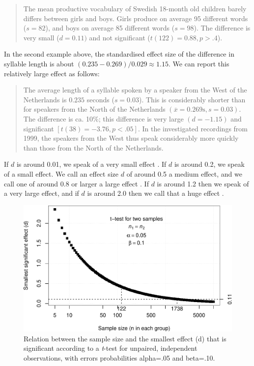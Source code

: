 \documentclass[
]{book}
\begin{document}
\begin{quote}
The mean productive vocabulary of Swedish 18-month old children
barely differs between girls and boys. Girls
produce on average 95 different words (\(s=82\)), and boys
on average 85 different words (\(s=98\)). The difference is very
small (\(d=0.11)\) and not significant (\(t(122)=0.88, p>.4\)).
\end{quote}

In the second example above, the standardised effect size of the difference
in syllable length is about
\((0.235-0.269)/0.029 \approx 1.15\). We can report this relatively large
effect as follows:

\begin{quote}
The average length of a syllable spoken by a speaker from
the West of the Netherlands is \(0.235\) seconds (\(s=0.03\)). This is
considerably shorter than for speakers from the North of the Netherlands
\((\overline{x}=0.269 \textrm{s}, s=0.03)\). The difference is ca. 10\%; this
difference is very large \((d=-1.15)\) and significant
\([t(38)=-3.76, p<.05]\). In the investigated recordings from 1999, the
speakers from the West thus speak considerably more quickly than those from
the North of the Netherlands.
\end{quote}

If \(d\) is around 0.01, we speak of a very small effect \citep{Sawi09}.
If \(d\) is around 0.2, we speak of a small effect. We call an effect size
\(d\) of around 0.5 a medium effect, and we call one
of around 0.8 or larger a large effect \citep{Cohen88, Rose08}.
If \(d\) is around 1.2 then we speak of a very large effect, and if \(d\) is around 2.0 then we call that a huge effect \citep{Sawi09}.

\begin{figure}
\centering
\includegraphics{QMS-EN_files/figure-latex/smallestsignifdifference-1.pdf}
\caption{\label{fig:smallestsignifdifference}Relation between the sample size and the smallest effect (d) that is significant according to a \emph{t}-test for unpaired, independent observations, with errors probabilities alpha=.05 and beta=.10.}
\end{figure}
\end{document}
